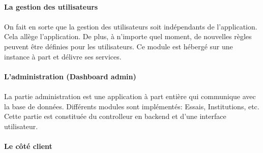 \paragraph{La gestion des utilisateurs}
\paragraph{}
On fait en sorte que la gestion des utilisateurs soit indépendants de l'application.
Cela allège l'application. De plus, à n'importe quel moment, de nouvelles règles peuvent être définies
pour les utilisateurs. Ce module est hébergé sur une instance à part et délivre ses services.
\paragraph{L'administration (Dashboard admin)}
\paragraph{}
La partie administration est une application à part entière qui communique avec la base de données.
Différents modules sont implémentés: Essais, Institutions, etc. Cette partie est constituée du controlleur
en backend et d'une interface utilisateur.
\paragraph{Le côté client}
